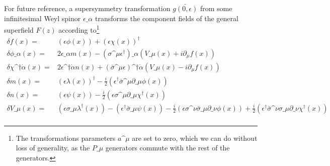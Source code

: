\documentclass[../main.tex]{subfiles}
\begin{document}
\begin{temporary}
  For future reference, a supersymmetry transformation \(\bar{g(0, \epsilon)}\) from some infinitesimal Weyl spinor \(\epsilon\_\alpha\) transforms the component fields of the general superfield \(F(z)\) according to\footnote{The transformations parameters \(a\^\mu\) are set to zero, which we can do without loss of generality, as the \(P\_\mu\) generators commute with the rest of the generators.}\needcite
  \begin{subequations}
    \begin{align}
      \delta f(x) =                         & (\epsilon\phi(x)) + (\epsilon \chi(x))^\dagger                                                                                                                                                                                                               \\
      \delta \phi\_\alpha(x) =              & 2\epsilon\_\alpha m(x) - (\sigma\^\mu \epsilon^\dagger)\_\alpha (V\_\mu(x) + i\partial_\mu f(x))                                                                                                                                                             \\
      \delta \chi\^{\dagger\dot\alpha}(x) = & 2\epsilon\^{\dagger\dot\alpha} n(x) + (\bar\sigma\^\mu \epsilon)\^{\dagger\dot\alpha} (V\_\mu(x) - i\partial_\mu f(x))                                                                                                                                       \\
      \delta m(x) =                         & (\epsilon \lambda(x))^\dagger - \frac{i}{2} (\epsilon^\dagger \bar\sigma\^\mu \partial\_\mu \phi(x))                                                                                                                                                         \\
      \delta n(x) =                         & (\epsilon \psi(x)) - \frac{i}{2} (\epsilon \sigma\^\mu \partial\_\mu \chi^\dagger(x))                                                                                                                                                                        \\
      \delta V\_\mu(x) =                    & (\epsilon \sigma\_\mu \lambda^\dagger(x)) - (\epsilon^\dagger \bar\sigma\_\mu \psi(x)) - \frac{i}{2} (\epsilon \sigma\^\nu \bar\sigma\_\mu \partial\_\nu \phi(x)) + \frac{i}{2} (\epsilon^\dagger \bar\sigma\^\nu \sigma\_\mu \partial\_\nu \chi^\dagger(x)) \\

\end{align}
\end{subequations}
\end{temporary}
\end{document}
